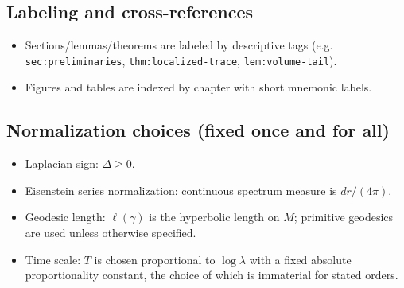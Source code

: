 \subsection*{Labeling and cross-references}
\begin{itemize}
  \item Sections/lemmas/theorems are labeled by descriptive tags (e.g. \texttt{sec:preliminaries}, \texttt{thm:localized-trace}, \texttt{lem:volume-tail}).
  \item Figures and tables are indexed by chapter with short mnemonic labels.
\end{itemize}

\subsection*{Normalization choices (fixed once and for all)}
\begin{itemize}
  \item Laplacian sign: $\Delta\ge 0$.
  \item Eisenstein series normalization: continuous spectrum measure is $dr/(4\pi)$.
  \item Geodesic length: $\ell(\gamma)$ is the hyperbolic length on $M$; primitive geodesics are used unless otherwise specified.
  \item Time scale: $T$ is chosen proportional to $\log \lambda$ with a fixed absolute proportionality constant, the choice of which is immaterial for stated orders.
\end{itemize}
